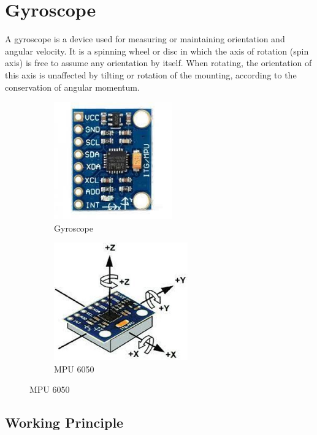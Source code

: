 \section{Gyroscope}

A gyroscope is a device used for measuring or maintaining orientation and angular velocity. It is a spinning wheel or disc in which the axis of rotation (spin axis) is free to assume any orientation by itself. When rotating, the orientation of this axis is unaffected by tilting or rotation of the mounting, according to the conservation of angular momentum.

\begin{figure}[h!]
	\centering
	\begin{subfigure}[b]{0.45\textwidth}
		\includegraphics[width=\textwidth,height=2in]{./images/Gyro.jpeg}
		\caption{Gyroscope}
		\label{gyro-1}
	\end{subfigure}
	\begin{subfigure}[b]{0.45\textwidth}
		\centering
		\includegraphics[width=\textwidth,height=2in]{./images/Gyro2.jpeg}
		\caption{MPU 6050}
		\label{gyro-2}
	\end{subfigure}
\end{figure}

\subsection{Working Principle}

